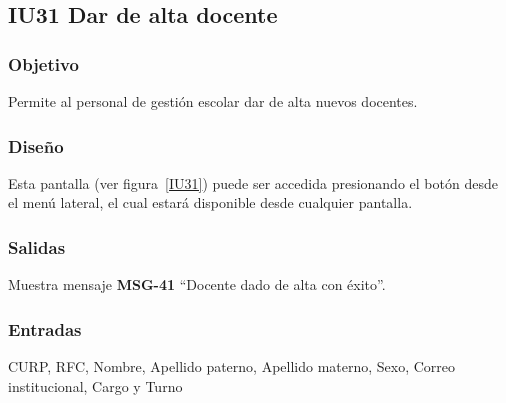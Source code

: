 
\subsection{IU31 Dar de alta docente}
\subsubsection{Objetivo}
    Permite al personal de gestión escolar dar de alta nuevos docentes.
\subsubsection{Diseño}
    Esta pantalla  (ver figura~\ref{IU31}) puede ser accedida presionando el botón  desde el menú lateral, el cual estará disponible desde cualquier pantalla.

\subsubsection{Salidas}
Muestra mensaje {\bf MSG-41} ``Docente dado de alta con éxito''.
\subsubsection{Entradas}
CURP, RFC, Nombre, Apellido paterno, Apellido materno, Sexo, Correo institucional, Cargo y Turno
